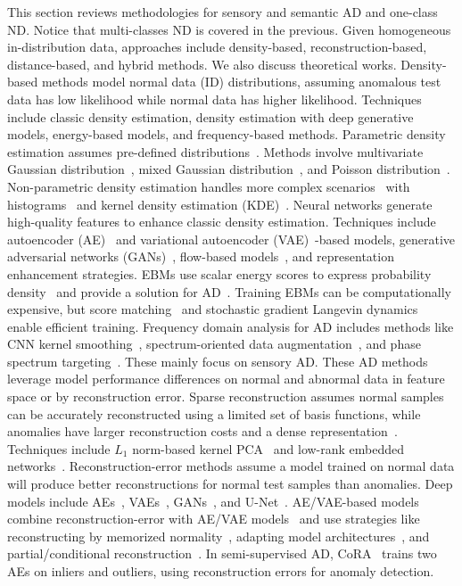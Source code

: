\label{sec:anomaly}
This section reviews methodologies for sensory and semantic AD and one-class ND. Notice that multi-classes ND is covered in the previous. 
Given homogeneous in-distribution data, approaches include density-based, reconstruction-based, distance-based, and hybrid methods. We also discuss theoretical works.
\smallskip
{}
\label{sec:ad_density}
Density-based methods model normal data (ID) distributions, assuming anomalous test data has low likelihood while normal data has higher likelihood. Techniques include classic density estimation, density estimation with deep generative models, energy-based models, and frequency-based methods.
Parametric density estimation assumes pre-defined distributions~. Methods involve multivariate Gaussian distribution~, mixed Gaussian distribution~, and Poisson distribution~. Non-parametric density estimation handles more complex scenarios~ with histograms~ and kernel density estimation (KDE)~.
Neural networks generate high-quality features to enhance classic density estimation. Techniques include autoencoder (AE)~ and variational autoencoder (VAE)~-based models, generative adversarial networks (GANs)~, flow-based models~, and representation enhancement strategies.
EBMs use scalar energy scores to express probability density~ and provide a solution for AD~. Training EBMs can be computationally expensive, but score matching~ and stochastic gradient Langevin dynamics~ enable efficient training.
Frequency domain analysis for AD includes methods like CNN kernel smoothing~, spectrum-oriented data augmentation~, and phase spectrum targeting~. These mainly focus on sensory AD.
\smallskip
{}
\label{sec:ad_reconstruction}
These AD methods leverage model performance differences on normal and abnormal data in feature space or by reconstruction error.
Sparse reconstruction assumes normal samples can be accurately reconstructed using a limited set of basis functions, while anomalies have larger reconstruction costs and a dense representation~. Techniques include $L_1$ norm-based kernel PCA~ and low-rank embedded networks~.
Reconstruction-error methods assume a model trained on normal data will produce better reconstructions for normal test samples than anomalies. Deep models include AEs~, VAEs~, GANs~, and U-Net~.
AE/VAE-based models combine reconstruction-error with AE/VAE models~ and use strategies like reconstructing by memorized normality~, adapting model architectures~, and partial/conditional reconstruction~. In semi-supervised AD, CoRA~ trains two AEs on inliers and outliers, using reconstruction errors for anomaly detection.
